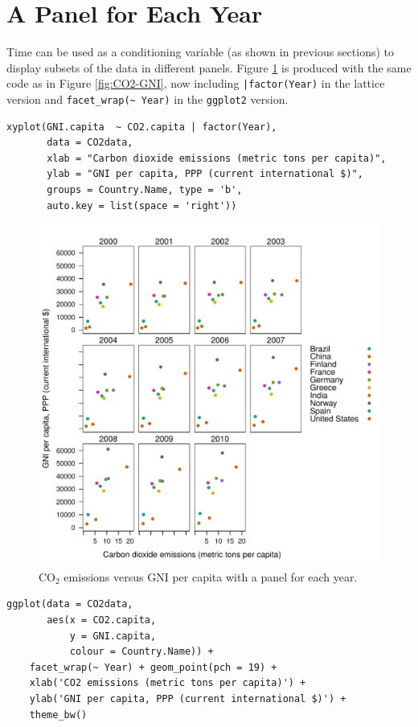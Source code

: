\section{A Panel for Each Year}
\label{sec:orga81495a}
Time can be used as a conditioning variable (as shown in previous
sections) to display subsets of the data in different panels. Figure
\ref{fig:CO2-GNI-panel} is produced with the same code as in Figure
\ref{fig:CO2-GNI}, now including \texttt{|factor(Year)} in the lattice
version and \texttt{facet\_wrap(\textasciitilde{} Year)} in the \texttt{ggplot2} version.

\lstset{language=r,label= ,caption= ,captionpos=b,numbers=none}
\begin{lstlisting}
xyplot(GNI.capita  ~ CO2.capita | factor(Year),
       data = CO2data,
       xlab = "Carbon dioxide emissions (metric tons per capita)",
       ylab = "GNI per capita, PPP (current international $)",
       groups = Country.Name, type = 'b',
       auto.key = list(space = 'right'))
\end{lstlisting}

\begin{figure}[htbp]
\centering
\includegraphics[width=.9\linewidth]{figs/CO2_capita_panel.pdf}
\caption{\(\mathrm{CO_2}\) emissions versus GNI per capita with a panel for each year. \label{fig:CO2-GNI-panel}}
\end{figure}

\lstset{language=r,label= ,caption= ,captionpos=b,numbers=none}
\begin{lstlisting}
ggplot(data = CO2data,
       aes(x = CO2.capita,
           y = GNI.capita,
           colour = Country.Name)) +
    facet_wrap(~ Year) + geom_point(pch = 19) + 
    xlab('CO2 emissions (metric tons per capita)') +
    ylab('GNI per capita, PPP (current international $)') +
    theme_bw()
\end{lstlisting}

